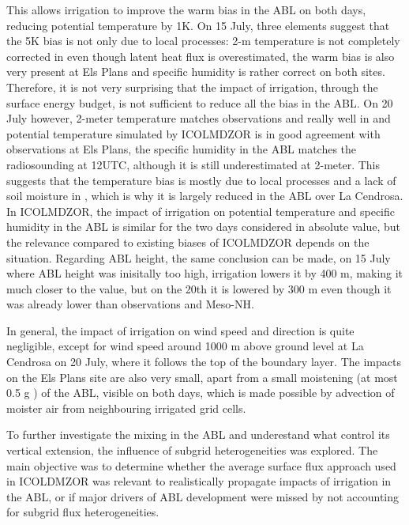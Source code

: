 This allows irrigation to improve the warm bias in the ABL on both days, reducing potential temperature by 1K. 
On 15 July, three elements suggest that the 5K bias is not only due to local processes: 2-m temperature is not completely corrected in \irrboost even though latent heat flux is overestimated, the warm bias is also very present at Els Plans and specific humidity is rather correct on both sites. Therefore, it is not very surprising that the impact of irrigation, through the surface energy budget, is not sufficient to reduce all the bias in the ABL. 
On 20 July however, 2-meter temperature matches observations and \mesomean really well in \irrboost and potential temperature simulated by ICOLMDZOR is in good agreement with observations at Els Plans, the specific humidity in the ABL matches the radiosounding at 12UTC, although it is still underestimated at 2-meter. This suggests that the temperature bias is mostly due to local processes and a lack of soil moisture in \noirr, which is why it is largely reduced in the ABL over La Cendrosa.
In ICOLMDZOR, the impact of irrigation on potential temperature and specific humidity in the ABL is similar for the two days considered in absolute value, but the relevance compared to existing biases of ICOLMDZOR depends on the situation.
Regarding ABL height, the same conclusion can be made, on 15 July where ABL height was inisitally too high, irrigation lowers it by 400 m, making it much closer to the \mesomean value, but on the 20th it is lowered by 300 m even though it was already lower than observations and Meso-NH.

In general, the impact of irrigation on wind speed and direction is quite negligible, except for wind speed around 1000 m above ground level at La Cendrosa on 20 July, where it follows the top of the boundary layer.
The impacts on the Els Plans site are also very small, apart from a small moistening (at most 0.5 g \perkg) of the ABL, visible on both days, which is made possible by advection of moister air from neighbouring irrigated grid cells.

To further investigate the mixing in the ABL and underestand what control its vertical extension, the influence of subgrid heterogeneities was explored.
The main objective was to determine whether the average surface flux approach used in ICOLDMZOR was relevant to realistically propagate impacts of irrigation in the ABL, or if major drivers of ABL development were missed by not accounting for subgrid flux heterogeneities. 

